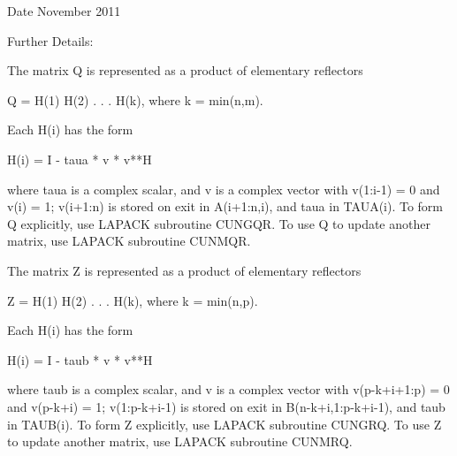 \begin{DoxyDate}{Date}
November 2011 
\end{DoxyDate}
\begin{DoxyParagraph}{Further Details\+: }
\begin{DoxyVerb}  The matrix Q is represented as a product of elementary reflectors

     Q = H(1) H(2) . . . H(k), where k = min(n,m).

  Each H(i) has the form

     H(i) = I - taua * v * v**H

  where taua is a complex scalar, and v is a complex vector with
  v(1:i-1) = 0 and v(i) = 1; v(i+1:n) is stored on exit in A(i+1:n,i),
  and taua in TAUA(i).
  To form Q explicitly, use LAPACK subroutine CUNGQR.
  To use Q to update another matrix, use LAPACK subroutine CUNMQR.

  The matrix Z is represented as a product of elementary reflectors

     Z = H(1) H(2) . . . H(k), where k = min(n,p).

  Each H(i) has the form

     H(i) = I - taub * v * v**H

  where taub is a complex scalar, and v is a complex vector with
  v(p-k+i+1:p) = 0 and v(p-k+i) = 1; v(1:p-k+i-1) is stored on exit in
  B(n-k+i,1:p-k+i-1), and taub in TAUB(i).
  To form Z explicitly, use LAPACK subroutine CUNGRQ.
  To use Z to update another matrix, use LAPACK subroutine CUNMRQ.\end{DoxyVerb}
 
\end{DoxyParagraph}
